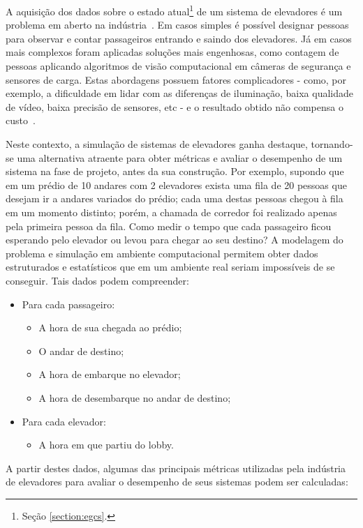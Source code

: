 A aquisição dos dados sobre o estado atual\footnote{Seção \ref{section:egcs}.}
de um sistema de elevadores é um problema em aberto na
indústria~\cite{KOEHLEROTTIGER02}. Em casos simples é possível designar pessoas
para observar e contar passageiros entrando e saindo dos elevadores. Já em casos
mais complexos foram aplicadas soluções mais engenhosas, como contagem de
pessoas aplicando algoritmos de visão computacional em câmeras de segurança e
sensores de carga. Estas abordagens possuem fatores complicadores - como, por
exemplo, a dificuldade em lidar com as diferenças de iluminação, baixa qualidade
de vídeo, baixa precisão de sensores, etc - e o resultado obtido não compensa o
custo~\cite{KOEHLEROTTIGER02}.

Neste contexto, a simulação de sistemas de elevadores ganha destaque, tornando-
se uma alternativa atraente para obter métricas e avaliar o desempenho de um
sistema na fase de projeto, antes da sua construção. Por exemplo, supondo que em
um prédio de 10 andares com 2 elevadores exista uma fila de 20 pessoas que
desejam ir a andares variados do prédio; cada uma destas pessoas chegou à fila
em um momento distinto; porém, a chamada de corredor foi realizado apenas pela
primeira pessoa da fila. Como medir o tempo que cada passageiro ficou esperando
pelo elevador ou levou para chegar ao seu destino? A modelagem do problema e
simulação em ambiente computacional permitem obter dados estruturados e
estatísticos que em um ambiente real seriam impossíveis de se conseguir. Tais
dados podem compreender:

\begin{itemize}
  \item Para cada passageiro:
  \begin{itemize}
    \item A hora de sua chegada ao prédio;
    \item O andar de destino;
    \item A hora de embarque no elevador;
    \item A hora de desembarque no andar de destino;
  \end{itemize}
  \item Para cada elevador:
  \begin{itemize}
    \item A hora em que partiu do lobby.
  \end{itemize}
\end{itemize}

A partir destes dados, algumas das principais métricas utilizadas pela indústria
de elevadores para avaliar o desempenho de seus sistemas podem ser calculadas:

